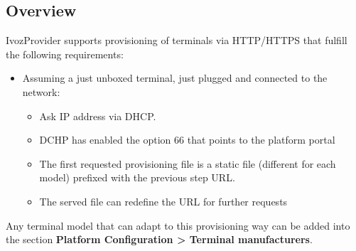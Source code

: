 \documentclass[letterpaper,10pt,spanish]{sphinxmanual}
\begin{document}
\subsection{Overview}
\label{administration_portal/platform/terminal_manufacturers:overview}
IvozProvider supports provisioning of terminals via HTTP/HTTPS that fulfill the
following requirements:
\begin{itemize}
\item {} 
Assuming a just unboxed terminal, just plugged and connected to the network:
\begin{itemize}
\item {} 
Ask IP address via DHCP.

\item {} 
DCHP has enabled the option 66 that points to the platform portal

\item {} 
The first requested provisioning file is a static file (different for each
model) prefixed with the previous step URL.

\item {} 
The served file can redefine the URL for further requests

\end{itemize}

\end{itemize}

Any terminal model that can adapt to this provisioning way can be added into
the section \textbf{Platform Configuration \textgreater{} Terminal manufacturers}.
\end{document}
